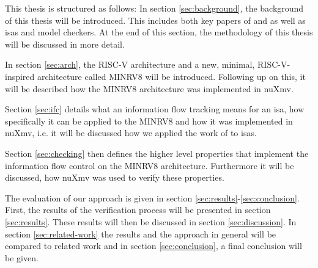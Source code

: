 This thesis is structured as follows:
In section \ref{sec:background}, the background of this thesis will be introduced.
This includes both key papers of \citeauthor{Reid17} and \citeauthor{Ferraiuolo17} as well as \glspl{isa} and model checkers.
At the end of this section, the methodology of this thesis will be discussed in more detail.

In section \ref{sec:arch}, the RISC-V architecture and a new, minimal, RISC-V-inspired architecture called MINRV8 will be introduced.
Following up on this, it will be described how the MINRV8 architecture was implemented in nuXmv.

Section \ref{sec:ifc} details what an information flow tracking means for an \gls{isa}, how specifically it can be applied to the MINRV8 and how it was implemented in nuXmv, i.e. it will be discussed how we applied the work of \citeauthor{Ferraiuolo17} \cite{Ferraiuolo17} to \glspl{isa}.

Section \ref{sec:checking} then defines the higher level properties that implement the information flow control on the MINRV8 architecture.
Furthermore it will be discussed, how nuXmv was used to verify these properties.

The evaluation of our approach is given in section \ref{sec:results}-\ref{sec:conclusion}.
First, the results of the verification process will be presented in section \ref{sec:results}.
These results will then be discussed in section \ref{sec:discussion}.
In section \ref{sec:related-work} the results and the approach in general will be compared to related work and in section \ref{sec:conclusion}, a final conclusion will be given.

